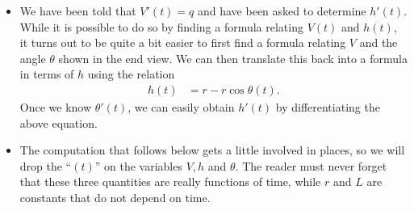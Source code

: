 \begin{eg}
\begin{itemize}
\item We have been told that $V'(t)=q$ and have been asked to determine $h'(t)$. While it is
possible to do so by finding a formula relating $V(t)$ and $h(t)$, it turns out to be
quite a bit easier to first find a formula relating $V$ and the angle $\theta$ shown in
the end view. We can then translate this back into a formula in terms of $h$ using the
relation
\begin{align*}
  h(t) &= r - r\cos \theta(t).
\end{align*}
Once we know $\theta'(t)$, we can easily obtain $h'(t)$ by differentiating the above
equation.

\item The computation that follows below gets a little involved in places, so we will
drop the ``$(t)$'' on the variables $V,h$ and $\theta$. The reader must never forget that
these three quantities are really functions of time, while $r$ and $L$ are constants that
do not depend on time.


\end{itemize}
\end{eg}
